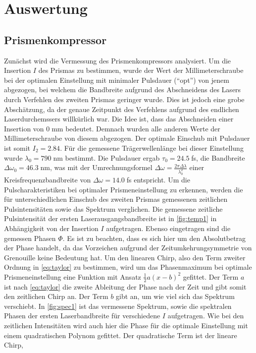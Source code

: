 \documentclass[twoside,        %
               BCOR12mm,       %
               english,ngerman, %
               fleqn,headsepline=false,footsepline=false
              ]{Vorlage/MFPREPORT}
\begin{document}
\section{Auswertung}
\label{sec:auswertung}
\subsection{Prismenkompressor}
Zunächst wird die Vermessung des Prismenkompressors analysiert. Um die Insertion $I$ des
Prismas zu bestimmen, wurde der Wert der Millimeterschraube bei der optimalen
Einstellung mit minimaler Pulsdauer (``opt'') von jenem abgezogen, bei welchem
die Bandbreite aufgrund des Abschneidens des Lasers durch Verfehlen des zweiten
Prismas geringer wurde. Dies ist jedoch eine grobe Abschätzung, da der genaue
Zeitpunkt des Verfehlens aufgrund des endlichen Laserdurchemssers willkürlich
war. Die Idee ist, dass das Abschneiden einer Insertion von $0\;$mm bedeutet.
Demnach wurden alle anderen Werte der Millimeterschraube von diesem abgezogen. 
Der optimale Einschub mit Pulsdauer ist somit $I_2=2.84$. Für die gemessene
Trägerwellenlänge bei dieser Einstellung wurde $\lambda_0=790\;$nm bestimmt. Die
Pulsdauer ergab $\tau_0=24.5\;$fs, die Bandbreite $\Delta\omega_0=46.3\;$nm,
was mit der Umrechnungsformel $\Delta\omega=\frac{2\pi\Delta\lambda}{\lambda_0^2}$ einer Kreisfrequenzbandbreite von $\Delta\omega=14.0\;$fs entspricht.
Um die Pulscharakteristiken bei optimaler Prismeneinstellung zu erkennen,
werden die für unterschiedlichen Einschub des zweiten Prismas gemessenen zeitlichen
Pulsintensitäten sowie das Spektrum verglichen. 
Die gemessene zeitliche Pulsintensität der ersten Laserausgangsbandbreite ist in
\cref{fig:temp1} in Abhängigkeit von der Insertion $I$ aufgetragen. Ebenso
eingetragen sind die gemessen Phasen $\Phi$. Es ist zu beachten, dass es sich
hier um den Absolutbetrag der Phase handelt, da das Vorzeichen aufgrund der
Zeitumkehrungsymmetrie von Grenouille keine Bedeutung hat. Um den linearen Chirp, also den Term zweiter Ordnung in \cref{eq:taylor} zu bestimmen, wird um das
Phasenmaximum bei optimale Prismeneinstellung eine Funktion mit Ansatz
$\frac{1}{2}a(x-b)^2$ gefittet. Der Term $a$ ist nach \cref{eq:taylor} die
zweite Ableitung der Phase nach der Zeit und gibt somit den zeitlichen Chirp
an. Der Term $b$ gibt an, um wie viel sich das Spektrum verschiebt. In \cref{fig:spec1} ist das vermessene Spektrum, sowie die spektralen Phasen der ersten Laserbandbreite für verschiedene $I$ aufgetragen. Wie bei den zeitlichen Intensitäten wird auch hier die Phase für die optimale Einstellung mit einem quadratischen Polynom gefittet. Der quadratische Term ist der lineare Chirp,
\end{document}
